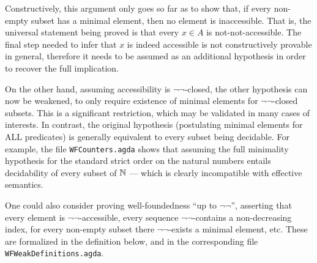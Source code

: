 Constructively, this argument only goes so far as to show that, if every non-empty
subset has a minimal element, then no element is inaccessible.
That is, the universal statement being proved is that every $x \in A$
is not-not-accessible. The final step needed to infer that $x$ is indeed accessible
is not constructively provable in general, therefore it needs to be assumed as
an additional hypothesis in order to recover the full implication.

On the other hand, assuming accessibility is $\lnot\lnot$-closed, the other
hypothesis can now be weakened, to only require existence of minimal elements
for $\lnot\lnot$-closed subsets.  This is a significant restriction, which may
be validated in many cases of interests.  In contrast, the original hypothesis
(postulating minimal elements for ALL predicates)
is generally equivalent to every subset being decidable.
For example, the file \texttt{WFCounters.agda} shows that assuming the full minimality hypothesis
for the standard strict order on the natural numbers entails decidability
of every subset of $\mathbb{N}$ --- which is clearly incompatible with effective semantics.

One could also consider proving well-foundedness ``up to $\lnot\lnot$'',
asserting that every element is $\lnot\lnot$-accessible,
every sequence $\lnot\lnot$-contains a non-decreasing index,
for every non-empty subset there $\lnot\lnot$-exists a minimal element, etc.
These are formalized in the definition below, and in the corresponding file
\texttt{WFWeakDefinitions.agda}.

